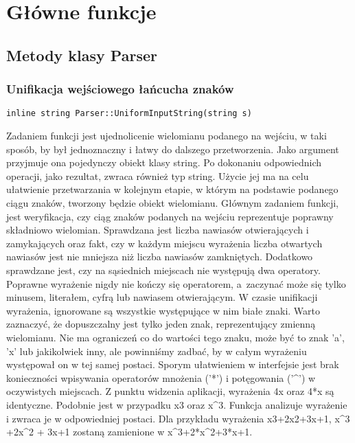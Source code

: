 \section{Główne funkcje}

\subsection{Metody klasy Parser}

\subsubsection{Unifikacja wejściowego łańcucha znaków}
\begin{lstlisting}
inline string Parser::UniformInputString(string s)
\end{lstlisting}

Zadaniem funkcji jest ujednolicenie wielomianu podanego na wejściu, w taki sposób, by był jednoznaczny i łatwy do dalszego przetworzenia. Jako argument przyjmuje ona pojedynczy obiekt klasy string. Po dokonaniu odpowiednich operacji, jako rezultat, zwraca również typ string. Użycie jej ma na celu ułatwienie przetwarzania w kolejnym etapie, w którym na podstawie podanego ciągu znaków, tworzony będzie obiekt wielomianu. Głównym zadaniem funkcji, jest weryfikacja, czy ciąg znaków podanych na wejściu reprezentuje poprawny składniowo wielomian. Sprawdzana jest liczba nawiasów otwierających i zamykających oraz fakt, czy w każdym miejscu wyrażenia liczba otwartych nawiasów jest nie mniejsza niż liczba nawiasów zamkniętych. Dodatkowo sprawdzane jest, czy na sąsiednich miejscach nie występują dwa operatory. Poprawne wyrażenie nigdy nie kończy się operatorem, a~zaczynać może się tylko minusem, literałem, cyfrą lub nawiasem otwierającym. W czasie unifikacji wyrażenia, ignorowane są wszystkie występujące w nim białe znaki. Warto zaznaczyć, że dopuszczalny jest tylko jeden znak, reprezentujący zmienną wielomianu. Nie ma ograniczeń co do wartości tego znaku, może być to znak 'a', 'x' lub jakikolwiek inny, ale powinniśmy zadbać, by w całym wyrażeniu występował on w tej samej postaci. Sporym ułatwieniem w interfejsie jest brak konieczności wpisywania operatorów mnożenia ('*') i potęgowania ('\^{}') w oczywistych miejscach. Z punktu widzenia aplikacji, wyrażenia 4x oraz 4*x są identyczne. Podobnie jest w przypadku x3 oraz x\^{}3. Funkcja analizuje wyrażenie i zwraca je w odpowiedniej postaci. Dla przykładu wyrażenia x3+2x2+3x+1, x\^{}3 +2x\^{}2 + 3x+1 zostaną zamienione w x\^{}3+2*x\^{}2+3*x+1.

